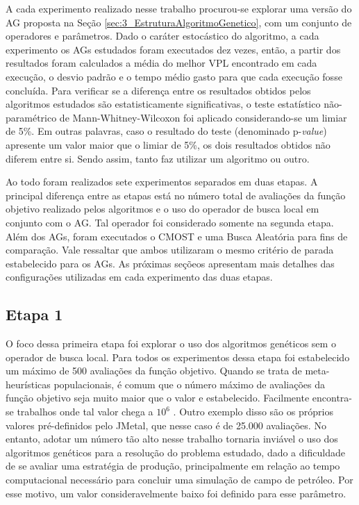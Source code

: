 A cada experimento realizado nesse trabalho procurou-se explorar uma versão do AG proposta na Seção \ref{sec:3_EstruturaAlgoritmoGenetico}, com um conjunto de operadores e parâmetros. Dado o caráter estocástico do algoritmo, a cada experimento os AGs estudados foram executados dez vezes, então, a partir dos resultados foram calculados a média do melhor VPL encontrado em cada execução, o desvio padrão e o tempo médio gasto para que cada execução fosse concluída. Para verificar se a diferença entre os resultados obtidos pelos algoritmos estudados são estatisticamente significativas, o teste estatístico não-paramétrico de Mann-Whitney-Wilcoxon \cite{Corder2014} foi aplicado considerando-se um limiar de 5\%. Em outras palavras, caso o resultado do teste (denominado p-\textit{value}) apresente um valor maior que o limiar de 5\%, os dois resultados obtidos não diferem entre si. Sendo assim, tanto faz utilizar um algoritmo ou outro. 

Ao todo foram realizados sete experimentos separados em duas etapas. A principal diferença entre as etapas está no número total de avaliações da função objetivo realizado pelos algoritmos e o uso do operador de busca local em conjunto com o AG. Tal operador foi considerado somente na segunda etapa. Além dos AGs, foram executados o CMOST e uma Busca Aleatória para fins de comparação. Vale ressaltar que ambos utilizaram o mesmo critério de parada estabelecido para os AGs. As próximas seçõeos apresentam mais detalhes das configurações utilizadas em cada experimento das duas etapas.

\subsection{Etapa 1}
\label{sec:4_Etapa1}
O foco dessa primeira etapa foi explorar o uso dos algoritmos genéticos sem o operador de busca local. Para todos os experimentos dessa etapa foi estabelecido um máximo de 500 avaliações da função objetivo. Quando se trata de meta-heurísticas populacionais, é comum que o número máximo de avaliações da função objetivo seja muito maior que o valor e estabelecido. Facilmente encontra-se trabalhos onde tal valor chega a $10^6$ \cite{Elsayed2016,Tangherloni2017,Kumar2017,Zamuda2017}. Outro exemplo disso são os próprios valores pré-definidos pelo JMetal, que nesse caso é de 25.000 avaliações. No entanto, adotar um número tão alto nesse trabalho tornaria inviável o uso dos algoritmos genéticos para a resolução do problema estudado, dado a dificuldade de se avaliar uma estratégia de produção, principalmente em relação ao tempo computacional necessário para concluir uma simulação de campo de petróleo. Por esse motivo, um valor consideravelmente baixo foi definido para esse parâmetro. 

